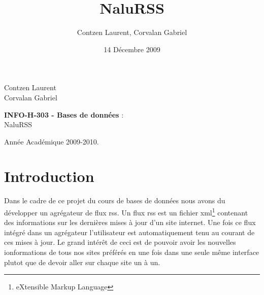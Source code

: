 \documentclass[11pt]{article}
\author{Contzen Laurent, Corvalan Gabriel}
\title{NaluRSS}
\date{14 Décembre 2009}
\begin{document}
\begin{titlepage}
\begin{flushleft}
Contzen Laurent \\
Corvalan Gabriel \\
\end{flushleft}
\begin{center}
\vspace{65mm}\LARGE{\textbf{INFO-H-303 - Bases de données} :\\
NaluRSS}
\end{center}
\begin{flushright}
\vspace{70mm}
Année Académique 2009-2010.
\end{flushright}
\end{titlepage}
\tableofcontents
\newpage

\section{Introduction}
Dans le cadre de ce projet du cours de bases de données nous avons du développer un agrégateur de flux rss. Un flux rss est un fichier xml\footnote{eXtensible Markup Language} contenant des informations sur les dernières mises à jour d'un site internet. Une fois ce flux intégré dans un agrégateur l'utilisateur est automatiquement tenu au courant de ces mises à jour. Le grand intérêt de ceci est de pouvoir avoir les nouvelles ionformations de tous nos sites préférés en une fois dans une seule même interface plutot que de devoir aller sur chaque site un à un.
\end{document}
